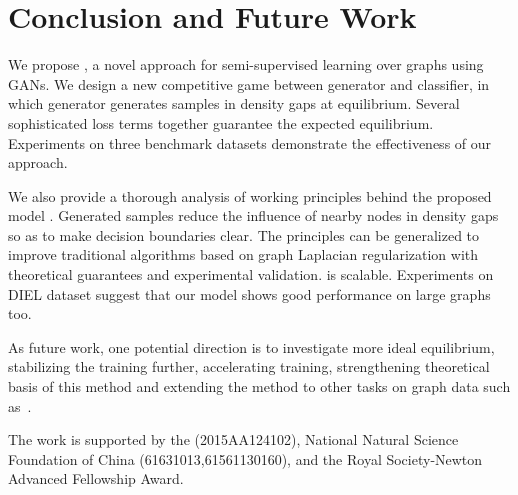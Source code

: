 \section{Conclusion and Future Work}
\label{sec:discuss}

We propose \model, a novel approach for semi-supervised learning over graphs using GANs. We design a new competitive game between generator and classifier, in which generator generates samples in density gaps at equilibrium. Several sophisticated loss terms together guarantee the expected equilibrium.
Experiments on three benchmark datasets demonstrate the effectiveness of our approach. 

We also provide a thorough analysis of working principles behind the proposed model \model. Generated samples reduce the influence of nearby nodes in density gaps so as to make decision boundaries clear. The principles can be generalized to improve traditional algorithms based on graph Laplacian regularization with theoretical guarantees and experimental validation. 
\smodel is scalable. Experiments on DIEL dataset suggest that our model shows good performance on large graphs too.%

As future work, one potential direction is to
investigate more ideal equilibrium, stabilizing the training further, accelerating training, strengthening theoretical basis of this method and extending the method to other tasks on graph data such as~\cite{Tang:08KDD}. 

The work is supported by the
(2015AA124102),
National Natural Science Foundation of China (61631013,61561130160),
and 
the Royal Society-Newton Advanced Fellowship Award.
